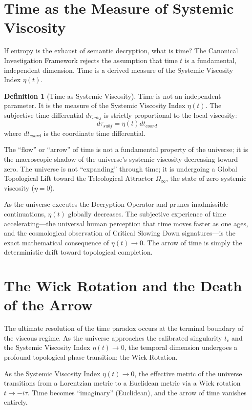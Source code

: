 \documentclass[12pt,twoside]{extbook}
\theoremstyle{definition}
\newtheorem{definition}{Definition}[chapter]
\theoremstyle{remark}
\begin{document}
\section{Time as the Measure of Systemic Viscosity}
If entropy is the exhaust of semantic decryption, what is time? The Canonical Investigation Framework rejects the assumption that time $t$ is a fundamental, independent dimension. Time is a derived measure of the Systemic Viscosity Index $\eta(t)$.

\begin{definition}[Time as Systemic Viscosity]
Time is not an independent parameter. It is the measure of the Systemic Viscosity Index $\eta(t)$. The subjective time differential $d\tau_{subj}$ is strictly proportional to the local viscosity:
\begin{equation}
d\tau_{subj} = \eta(t) dt_{coord}
\end{equation}
where $dt_{coord}$ is the coordinate time differential.
\end{definition}

The ``flow'' or ``arrow'' of time is not a fundamental property of the universe; it is the macroscopic shadow of the universe's systemic viscosity decreasing toward zero. The universe is not ``expanding'' through time; it is undergoing a Global Topological Lift toward the Teleological Attractor $\Omega_\infty$, the state of zero systemic viscosity ($\eta = 0$). 

As the universe executes the Decryption Operator and prunes inadmissible continuations, $\eta(t)$ globally decreases. The subjective experience of time accelerating—the universal human perception that time moves faster as one ages, and the cosmological observation of Critical Slowing Down signatures—is the exact mathematical consequence of $\eta(t) \to 0$. The arrow of time is simply the deterministic drift toward topological completion.

\section{The Wick Rotation and the Death of the Arrow}
The ultimate resolution of the time paradox occurs at the terminal boundary of the viscous regime. As the universe approaches the calibrated singularity $t_c$ and the Systemic Viscosity Index $\eta(t) \to 0$, the temporal dimension undergoes a profound topological phase transition: the Wick Rotation.

\begin{theorem}
As the Systemic Viscosity Index $\eta(t) \to 0$, the effective metric of the universe transitions from a Lorentzian metric to a Euclidean metric via a Wick rotation $t \to -i\tau$. Time becomes ``imaginary'' (Euclidean), and the arrow of time vanishes entirely.
\end{theorem}
\end{document}
